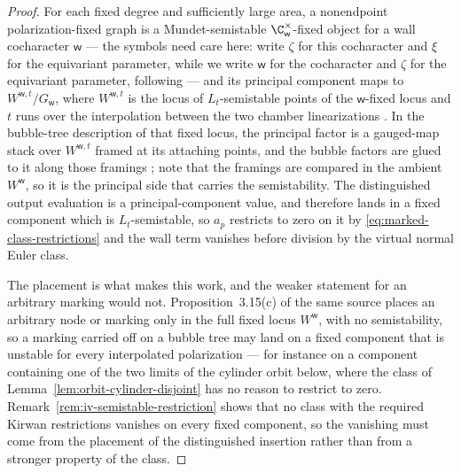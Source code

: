 \begin{proof}
For each fixed degree and sufficiently large area, a nonendpoint
polarization-fixed graph is a Mundet-semistable \(\C^\times_\mathsf w\)-fixed
object for a wall cocharacter \(\mathsf w\) --- the symbols need care
here: \cite{GonzalezWoodward} write \(\zeta\) for this cocharacter and
\(\xi\) for the equivariant parameter, while we write \(\mathsf w\) for the
cocharacter and \(\zeta\) for the equivariant parameter, following
\cite{WoodwardQKIII} --- and its principal component
maps to
\(W^{\mathsf w,t}/G_\mathsf w\), where \(W^{\mathsf w,t}\) is the locus of
\(L_t\)-semistable points of the \(\mathsf w\)-fixed locus and \(t\) runs over the
interpolation between the two chamber linearizations
\cite[Lemma~3.17 and Proposition~3.18]{GonzalezWoodward}.  In the bubble-tree
description of that fixed locus, the principal factor is a gauged-map stack
over \(W^{\mathsf w,t}\) framed at its attaching points, and the bubble factors are
glued to it along those framings
\cite[Remark~3.19]{GonzalezWoodward}; note that the framings are compared in
the ambient \(W^\mathsf w\), so it is the principal side that carries the
semistability.  The distinguished output
evaluation is a principal-component value, and therefore lands in a fixed
component which is \(L_t\)-semistable,
so \(a_p\) restricts to zero on it by
\eqref{eq:marked-class-restrictions} and the wall term vanishes
before division by the virtual normal Euler class.

The placement is what makes this work, and the weaker statement for an
arbitrary marking would not.  Proposition~3.15(c) of the same source places an
arbitrary node or marking only in the full fixed locus \(W^\mathsf w\), with no
semistability, so a marking carried off on a bubble tree may land on a fixed
component that is unstable for every interpolated polarization --- for
instance on a component containing one of the two limits of the cylinder
orbit below, where the class of
Lemma~\ref{lem:orbit-cylinder-disjoint} has no reason to restrict to zero.
Remark~\ref{rem:iv-semistable-restriction} shows that no class with the
required Kirwan restrictions vanishes on every fixed component, so the
vanishing must come from the placement of the distinguished insertion rather
than from a stronger property of the class.


\end{proof}
